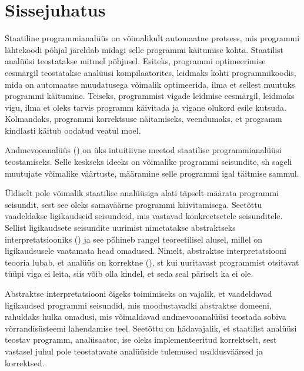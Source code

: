 \documentclass[../thesis.tex]{subfiles}
\begin{document}
\section*{Sissejuhatus}


Staatiline programmianalüüs on võimalikult automaatne protsess, mis programmi lähtekoodi põhjal järeldab midagi selle programmi käitumise kohta. Staatilist analüüsi teostatakse mitmel põhjusel. Esiteks, programmi optimeerimise eesmärgil teostatakse analüüsi kompilaatorites, leidmaks kohti programmikoodis, mida on automaatse muudatusega võimalik optimeerida, ilma et sellest muutuks programmi käitumine. Teiseks, programmist vigade leidmise eesmärgil, leidmaks vigu, ilma et oleks tarvis programm käivitada ja vigane olukord esile kutsuda. Kolmandaks, programmi korrektsuse näitamiseks, veendumaks, et programm kindlasti käitub oodatud veatul moel.

Andmevooanalüüs () on üks intuitiivne meetod staatilise programmianalüüsi teostamiseks. Selle keskseks ideeks on võimalike programmi seisundite, sh sageli muutujate võimalike väärtuste, määramine selle programmi igal täitmise sammul.

Üldiselt pole võimalik staatilise analüüsiga alati täpselt määrata programmi seisundit, sest see oleks samaväärne programmi käivitamisega. Seetõttu vaadeldakse ligikaudseid seisundeid, mis vastavad konkreetsetele seisunditele. Sellist ligikaudsete seisundite uurimist nimetatakse abstraktseks interpretatsiooniks () ja see põhineb rangel teoreetilisel alusel, millel on ligikaudsusele vaatamata head omadused. Nimelt, abstraktse interpretatsiooni teooria lubab, et analüüs on korrektne (), st kui uuritavast programmist otsitavat tüüpi viga ei leita, siis võib olla kindel, et seda seal päriselt ka ei ole.

Abstraktse interpretatsiooni õigeks toimimiseks on vajalik, et vaadeldavad ligikaudsed programmi seisundid, mis moodustavadki abstraktse domeeni, rahuldaks hulka omadusi, mis võimaldavad andmevooanalüüsi teostada sobiva võrrandisüsteemi lahendamise teel. Seetõttu on hädavajalik, et staatilist analüüsi teostav programm, analüsaator, ise oleks implementeeritud korrektselt, sest vastasel juhul pole teostatavate analüüside tulemused usaldusväärsed ja korrektsed.
\end{document}
